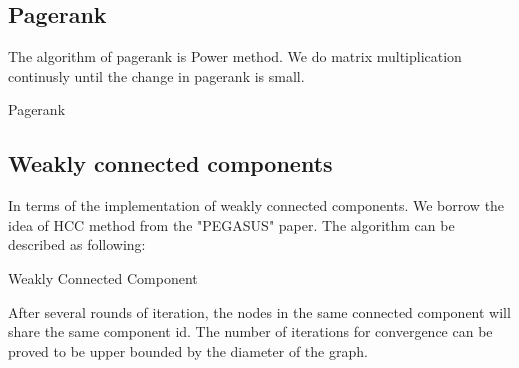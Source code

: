 \subsection{Pagerank}
The algorithm of pagerank is Power method. We do matrix multiplication continusly until the change in pagerank is small. 
\begin{algorithm}
\caption{Pagerank}
\begin{algorithmic}
\REPEAT
{}
\end{algorithmic}
\end{algorithm}

\subsection{Weakly connected components}
In terms of the implementation of weakly connected components. We borrow the idea of HCC method from the "PEGASUS" paper.\cite{Kang09}
The algorithm can be described as following:
\begin{algorithm}
\caption{Weakly Connected Component}
\begin{algorithmic}
\REPEAT
{}
\end{algorithmic}
\end{algorithm}
After several rounds of iteration, the nodes in the same connected component will share the same component id.
The number of iterations for convergence can be proved to be upper bounded by the diameter of the graph.


